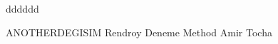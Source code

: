 \documentclass{exam}
\begin{document}
\begin{questions}
\question dddddd\newline
\begin{oneparchoices}
\choice ANOTHERDEGISIM
\choice Rendroy
\choice Deneme Method
\choice Amir Tocha
\end{oneparchoices}
\end{questions}
\end{document}

